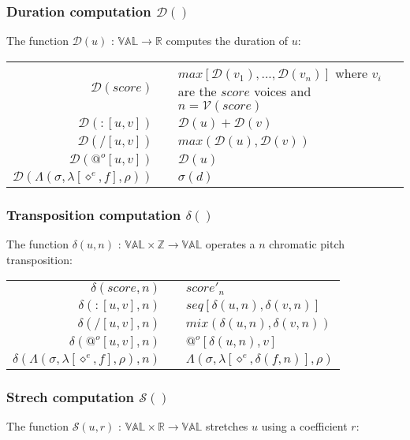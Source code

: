 \documentclass[10pt,a4paper,frenchb]{article}
\makeatletter
\newcommand{\var}[1]{\diamond^#1}
\newcommand{\val}{\mathbb{VAL}}
\newcommand{\closure}{\Lambda}
\newcommand{\noredex}{@^o}
\newcommand{\bdomain}[3]{$#1 \times #2 \rightarrow #3$}
\newcommand{\envsym}{\rho}
\newcommand{\closenv}[3][\var{e}]{\closure(#3,\lambda[#1,#2],\envsym)}
\newcommand{\seq}			{:}
\newcommand{\voices}		{{\mathcal V}}
\newcommand{\dur}			{{\mathcal D}}
\newcommand{\transp}		{\delta}
\renewcommand{\stretch}	{{\mathcal S}}
\newcommand{\bounds}		{\sigma}
\makeatother
\begin{document}
\subsubsection{Duration computation $\dur()$}
The function $\dur(u)$ : $\val \rightarrow \mathbb{R}$ computes the duration of $u$:

\begin{center}
\begin{tabular}{rc@{ $\rightarrow$ }l}
 \hline
 $\dur(score)$				& & $max[\dur(v_1),..., \dur(v_n)]$ where $v_i$ are the $score$ voices and $n=\voices(score)$\\
 $\dur(\seq [u,v])$		& & $\dur(u) + \dur(v)$ \\
 $\dur(/ [u,v])$ 			& & $max(\dur(u), \dur(v))$ \\
 $\dur(\noredex [u,v])$ 	& & $\dur(u)$ \\
 $\dur(\closenv{f}{\bounds})$ 	& & $\bounds(d)$ \\
 \hline
\end{tabular}
\end{center}

\subsubsection{Transposition computation $\transp()$}
The function $\transp(u,n)$ :  \bdomain{\val}{\mathbb{Z}}{\val} operates a $n$ chromatic pitch transposition:

\begin{center}
\begin{tabular*}{12cm}{rc@{ $\rightarrow$ }l}
 \hline
 $\transp(score,n)$				& & $score'_n$\\
 $\transp(\seq [u,v],n)$			& & $seq[\transp(u, n), \transp(v, n)]$ \\
 $\transp(/ [u,v],n)$ 			& & $mix(\transp(u, n), \transp(v, n))$ \\
 $\transp(\noredex [u,v],n)$ 	& & $\noredex[\transp(u,n),v]$ \\
 $\transp(\closenv{f}{\bounds},n)$ 	& & $\closenv{\transp(f,n)}{\bounds}$ \\
 \hline
\end{tabular*}
\end{center}

\subsubsection{Strech computation $\stretch()$}
The function $\stretch(u,r)$ :  \bdomain{\val}{\mathbb{R}}{\val} stretches $u$ using a coefficient $r$:
\end{document}
